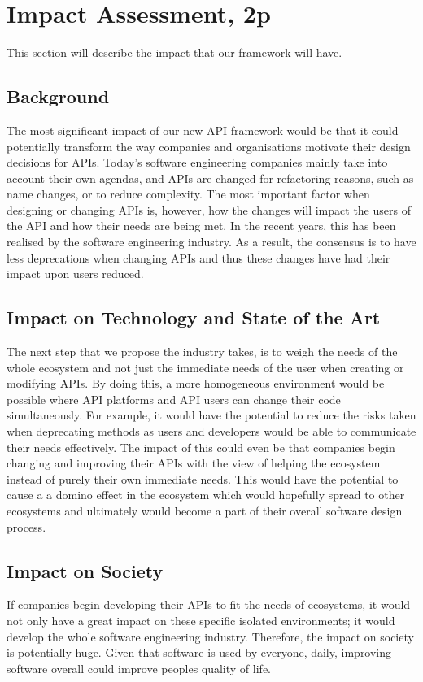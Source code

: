 \documentclass{article}
\begin{document}
\section{Impact Assessment, 2p}
This section will describe the impact that our framework will have. 

\subsection{Background}
The most significant impact of our new API framework would be that it could potentially transform the way companies and organisations motivate their design decisions for APIs. Today's software engineering companies mainly take into account their own agendas, and APIs are changed for refactoring reasons, such as name changes, or to reduce complexity. The most important factor when designing or changing APIs is, however, how the changes will impact the users of the API and how their needs are being met. In the recent years, this has been realised by the software engineering industry. As a result, the consensus is to have less deprecations when changing APIs and thus these changes have had their impact upon users reduced. 

\subsection{Impact on Technology and State of the Art}
The next step that we propose the industry takes, is to weigh the needs of the whole ecosystem and not just the immediate needs of the user when creating or modifying APIs. By doing this, a more homogeneous environment would be possible where API platforms and API users can change their code simultaneously. For example, it would have the potential to reduce the risks taken when deprecating methods as users and developers would be able to communicate their needs effectively. The impact of this could even be that companies begin changing and improving their APIs with the view of helping the ecosystem instead of purely their own immediate needs. This would have the potential to cause a a domino effect in the ecosystem which would hopefully spread to other ecosystems and ultimately would become a part of their overall software design process. 

\subsection{Impact on Society}
If companies begin developing their APIs to fit the needs of ecosystems, it would not only have a great impact on these specific isolated environments; it would develop the whole software engineering industry. Therefore, the impact on society is potentially huge. Given that software is used by everyone, daily, improving software overall could improve peoples quality of life.
\end{document}
